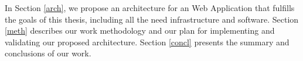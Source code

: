 
	In Section \ref{arch}, we propose an architecture for an Web Application that fulfills the goals of this thesis, including all the need infrastructure and software.
	Section \ref{meth} describes our work methodology and our plan for implementing and validating our proposed architecture.
	Section \ref{concl} presents the summary and conclusions of our work.

